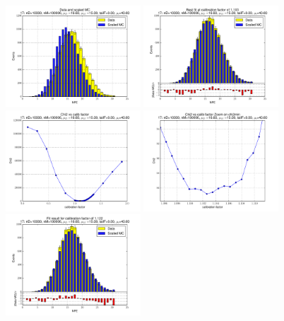 
 \begin{figure}[htbp] \begin{center} 
\includegraphics[width=0.45\textwidth]{../FIGURES/17/FIG_Data_and_scaled_MC.pdf} 
\includegraphics[width=0.45\textwidth]{../FIGURES/17/FIG_Best_fit_at_calibration_factor_of_1_103.pdf} 
\includegraphics[width=0.45\textwidth]{../FIGURES/17/FIG_Chi2_vs_calib_factor.pdf} 
\includegraphics[width=0.45\textwidth]{../FIGURES/17/FIG_Chi2_vs_calib_factor_Zoom_on_chi2min.pdf} 
\includegraphics[width=0.45\textwidth]{../FIGURES/17/FIG_Fit_result_for_calibration_factor_of_1_122.pdf} 

\end{center}
\end{figure}
